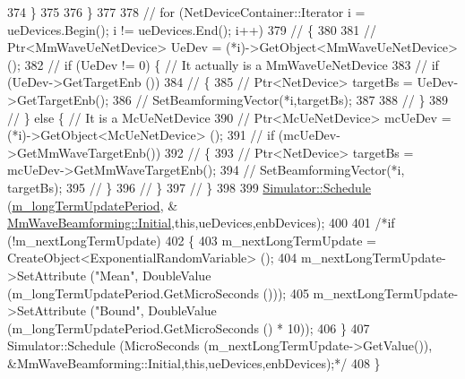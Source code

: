 \begin{DoxyCode}
374                 \}
375 
376         \}
377 
378         \textcolor{comment}{// for (NetDeviceContainer::Iterator i = ueDevices.Begin(); i != ueDevices.End(); i++)}
379         \textcolor{comment}{// \{}
380 
381         \textcolor{comment}{//      Ptr<MmWaveUeNetDevice> UeDev = (*i)->GetObject<MmWaveUeNetDevice> ();}
382         \textcolor{comment}{//      if (UeDev != 0) \{ // It actually is a MmWaveUeNetDevice}
383         \textcolor{comment}{//              if (UeDev->GetTargetEnb ())}
384         \textcolor{comment}{//              \{}
385         \textcolor{comment}{//                      Ptr<NetDevice> targetBs = UeDev->GetTargetEnb();}
386         \textcolor{comment}{//                      SetBeamformingVector(*i,targetBs);}
387 
388         \textcolor{comment}{//              \}}
389         \textcolor{comment}{//      \} else \{ // It is a McUeNetDevice}
390         \textcolor{comment}{//              Ptr<McUeNetDevice> mcUeDev = (*i)->GetObject<McUeNetDevice> (); }
391         \textcolor{comment}{//              if (mcUeDev->GetMmWaveTargetEnb())}
392         \textcolor{comment}{//              \{}
393         \textcolor{comment}{//                      Ptr<NetDevice> targetBs = mcUeDev->GetMmWaveTargetEnb();}
394         \textcolor{comment}{//                      SetBeamformingVector(*i, targetBs);}
395         \textcolor{comment}{//              \}}
396         \textcolor{comment}{//      \}}
397         \textcolor{comment}{// \}}
398 
399         \hyperlink{classns3_1_1Simulator_a671882c894a08af4a5e91181bf1eec13}{Simulator::Schedule} (\hyperlink{classns3_1_1MmWaveBeamforming_acdc1c52dae96b7e5b73a235f381e39f0}{m\_longTermUpdatePeriod}, &
      \hyperlink{classns3_1_1MmWaveBeamforming_ae7312fc9736ab3afacab1f5ff45b211c}{MmWaveBeamforming::Initial},\textcolor{keyword}{this},ueDevices,enbDevices);
400 
401         \textcolor{comment}{/*if (!m\_nextLongTermUpdate)}
402 \textcolor{comment}{        \{}
403 \textcolor{comment}{                m\_nextLongTermUpdate = CreateObject<ExponentialRandomVariable> ();}
404 \textcolor{comment}{                m\_nextLongTermUpdate->SetAttribute ("Mean", DoubleValue
       (m\_longTermUpdatePeriod.GetMicroSeconds ()));}
405 \textcolor{comment}{                m\_nextLongTermUpdate->SetAttribute ("Bound", DoubleValue
       (m\_longTermUpdatePeriod.GetMicroSeconds () * 10));}
406 \textcolor{comment}{        \}}
407 \textcolor{comment}{        Simulator::Schedule (MicroSeconds (m\_nextLongTermUpdate->GetValue()),
       &MmWaveBeamforming::Initial,this,ueDevices,enbDevices);*/}
408 \}
\end{DoxyCode}


